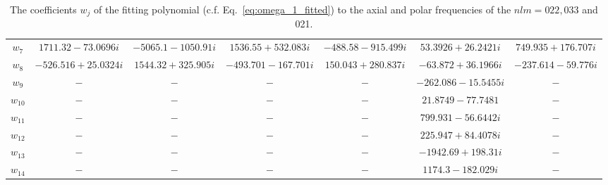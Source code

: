 \documentclass[aps,prx,amsmath,floats,floatfix,twocolumn,
  superscriptaddress,nofootinbib,showpacs]{revtex4-1}
\begin{document}
\begin{table}[]
{\begin{tabular}{c|cc|cc|cc|}
$w_7$                  & \multicolumn{1}{c|}{$ 1711.32 -73.0696 i $}      & $ -5065.1-1050.91i $     & \multicolumn{1}{c|}{$1536.55+532.083i $}   & $-488.58-915.499i $    & \multicolumn{1}{c|}{$53.3926+26.2421i $}    & $ 749.935 + 176.707i $     \\ 
$w_8$                  & \multicolumn{1}{c|}{$-526.516 + 25.0324  i $}      & $ 1544.32+325.905i $     & \multicolumn{1}{c|}{$-493.701-167.701i $}   & $150.043+280.837i $    & \multicolumn{1}{c|}{$- 63.872+ 36.1966i $}    & $ - 237.614 - 59.776i $     \\
$w_9$                  & \multicolumn{1}{c|}{$-$}      & $-$     & \multicolumn{1}{c|}{$-$}   & $- $    & \multicolumn{1}{c|}{$ - 262.086 - 15.5455i $}    & $ -$     \\ 
$w_{10}$                  & \multicolumn{1}{c|}{$-$}      & $-$     & \multicolumn{1}{c|}{$-$}   & $- $    & \multicolumn{1}{c|}{$ 21.8749 - 77.7481$}    & $-$     \\ 
$w_{11}$                  & \multicolumn{1}{c|}{$-$}      & $-$     & \multicolumn{1}{c|}{$-$}   & $- $    & \multicolumn{1}{c|}{$799.931 - 56.6442i $}    & $-$     \\ 
$w_{12}$                  & \multicolumn{1}{c|}{$-$}      & $-$     & \multicolumn{1}{c|}{$-$}   & $- $    & \multicolumn{1}{c|}{$225.947 + 84.4078i $}    & $- $     \\ 
$w_{13}$                  & \multicolumn{1}{c|}{$-$}      & $-$     & \multicolumn{1}{c|}{$-$}   & $- $    & \multicolumn{1}{c|}{$- 1942.69 +198.31i $}    & $- $     \\ 
$w_{14}$                  & \multicolumn{1}{c|}{$-$}      & $-$     & \multicolumn{1}{c|}{$-$}   & $- $    & \multicolumn{1}{c|}{$ 1174.3- 182.029i$}    & $ - $     \\ \hline
\end{tabular}
}
\caption{
\label{tab:poly_fit_coeffs}
The coefficients $w_j$ of the fitting polynomial (c.f. Eq.~\eqref{eq:omega_1_fitted}) to the axial and polar frequencies of the $nlm=022, 033$ and 021.}
\end{table}
\end{document}
